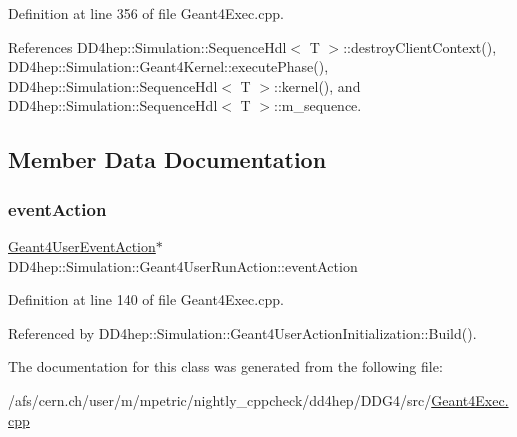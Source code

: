 Definition at line 356 of file Geant4\+Exec.\+cpp.



References D\+D4hep\+::\+Simulation\+::\+Sequence\+Hdl$<$ T $>$\+::destroy\+Client\+Context(), D\+D4hep\+::\+Simulation\+::\+Geant4\+Kernel\+::execute\+Phase(), D\+D4hep\+::\+Simulation\+::\+Sequence\+Hdl$<$ T $>$\+::kernel(), and D\+D4hep\+::\+Simulation\+::\+Sequence\+Hdl$<$ T $>$\+::m\+\_\+sequence.



\subsection{Member Data Documentation}
\hypertarget{class_d_d4hep_1_1_simulation_1_1_geant4_user_run_action_a6726ebc3d952df848fc4e8288d3bb6c0}{}\label{class_d_d4hep_1_1_simulation_1_1_geant4_user_run_action_a6726ebc3d952df848fc4e8288d3bb6c0} 
\subsubsection{\texorpdfstring{event\+Action}{eventAction}}
{\footnotesize\ttfamily \hyperlink{class_d_d4hep_1_1_simulation_1_1_geant4_user_event_action}{Geant4\+User\+Event\+Action}$\ast$ D\+D4hep\+::\+Simulation\+::\+Geant4\+User\+Run\+Action\+::event\+Action}



Definition at line 140 of file Geant4\+Exec.\+cpp.



Referenced by D\+D4hep\+::\+Simulation\+::\+Geant4\+User\+Action\+Initialization\+::\+Build().



The documentation for this class was generated from the following file\+:\begin{DoxyCompactItemize}
\item 
/afs/cern.\+ch/user/m/mpetric/nightly\+\_\+cppcheck/dd4hep/\+D\+D\+G4/src/\hyperlink{_geant4_exec_8cpp}{Geant4\+Exec.\+cpp}\end{DoxyCompactItemize}
